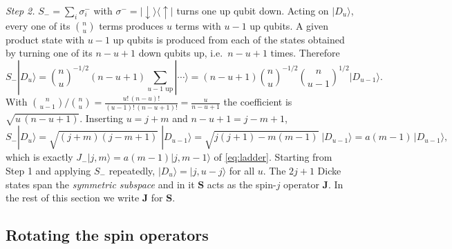 \documentclass[11pt,a4paper]{article}
\newcommand{\vJ}{\bm{J}}
\newcommand{\vS}{\bm{S}}
\newcommand{\up}{{\uparrow}}
\newcommand{\dn}{{\downarrow}}
\begin{document}
\emph{Step 2.} $S_- = \sum_i \sigma^-_i$ with $\sigma^- = |\dn\rangle\langle\up|$ turns one up qubit down. Acting on
$|D_u\rangle$, every one of its $\binom nu$ terms produces $u$ terms with $u-1$ up qubits. A given product state with
$u-1$ up qubits is produced from each of the states obtained by turning one of its $n-u+1$ down qubits up, i.e.\
$n-u+1$ times. Therefore
\begin{equation*}
  S_-|D_u\rangle = \binom nu^{-1/2}(n-u+1)\sum_{\text{$u-1$ up}}|\cdots\rangle
  = (n-u+1)\binom nu^{-1/2}\binom{n}{u-1}^{1/2}|D_{u-1}\rangle .
\end{equation*}
With $\binom{n}{u-1}\big/\binom nu = \frac{u!\,(n-u)!}{(u-1)!\,(n-u+1)!} = \frac{u}{n-u+1}$ the coefficient is
$\sqrt{u\,(n-u+1)}$. Inserting $u = j+m$ and $n-u+1 = j-m+1$,
\begin{equation*}
  S_-|D_u\rangle = \sqrt{(j+m)(j-m+1)}\;|D_{u-1}\rangle = \sqrt{j(j+1)-m(m-1)}\;|D_{u-1}\rangle = a(m-1)\,|D_{u-1}\rangle ,
\end{equation*}
which is exactly $J_-|j,m\rangle = a(m-1)|j,m-1\rangle$ of \eqref{eq:ladder}. Starting from Step 1 and applying $S_-$
repeatedly, $|D_u\rangle = |j,u-j\rangle$ for all $u$. The $2j+1$ Dicke states span the \emph{symmetric subspace} and in
it $\vS$ acts as the spin-$j$ operator $\vJ$. In the rest of this section we write $\vJ$ for $\vS$.

\subsection{Rotating the spin operators}\label{sec:rotation}
\end{document}

